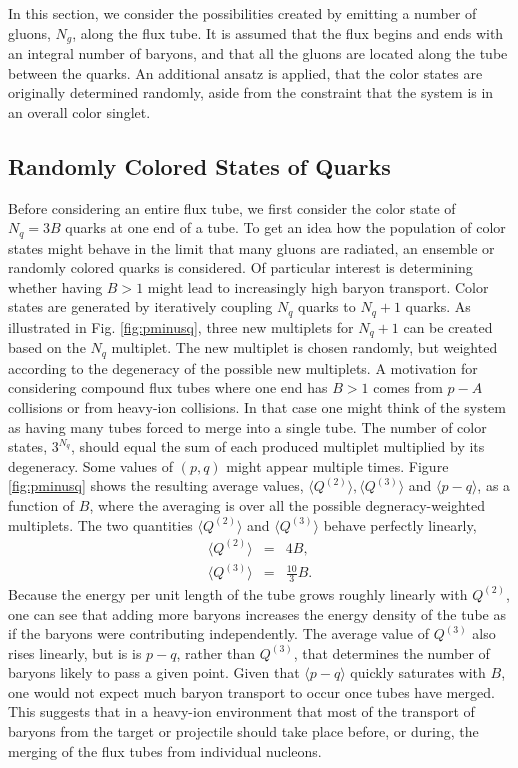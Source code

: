 \documentclass[aps, prc, 12pt, nofootinbib, showpacs, superscriptaddress, tightenlines, groupedaddress]{revtex4-2}
\begin{document}
In this section, we consider the possibilities created by emitting a number of gluons, $N_g$, along the flux tube. It is assumed that the flux begins and ends with an integral number of baryons, and that all the gluons are located along the tube between the quarks. An additional ansatz is applied, that the color states are originally determined randomly, aside from the constraint that the system is in an overall color singlet.

\subsection{Randomly Colored States of Quarks}

Before considering an entire flux tube, we first consider the color state of $N_q=3B$ quarks at one end of a tube. To get an idea how the population of color states might behave in the limit that many gluons are radiated, an ensemble or randomly colored quarks is considered. Of particular interest is determining whether having $B>1$ might lead to increasingly high baryon transport. Color states are generated by iteratively coupling $N_q$ quarks to $N_q+1$ quarks. As illustrated in Fig. \ref{fig:pminusq}, three new multiplets for $N_q+1$ can be created based on the $N_q$ multiplet. The new multiplet is chosen randomly, but weighted according to the degeneracy of the possible new multiplets. A motivation for considering compound flux tubes where one end has $B>1$ comes from $p-A$ collisions or from heavy-ion collisions. In that case one might think of the system as having many tubes forced to merge into a single tube. The number of color states, $3^{N_q}$, should equal the sum of each produced multiplet multiplied by its degeneracy. Some values of $(p,q)$ might appear multiple times. Figure \ref{fig:pminusq} shows the resulting average values, $\langle Q^{(2)}\rangle, \langle Q^{(3)}\rangle$ and $\langle p-q\rangle$, as a function of $B$, where the averaging is over all the possible degneracy-weighted multiplets. The two quantities $\langle Q^{(2)}\rangle$ and  $\langle Q^{(3)}\rangle$ behave perfectly linearly,
\begin{eqnarray}
\langle Q^{(2)}\rangle&=&4B,\\
\langle Q^{(3)}\rangle&=&\frac{10}{3}B.
\end{eqnarray}
Because the energy per unit length of the tube grows roughly linearly with $Q^{(2)}$, one can see that adding more baryons increases the energy density of the tube as if the baryons were contributing independently. The average value of $Q^{(3)}$ also rises linearly, but is is $p-q$, rather than $Q^{(3)}$, that determines the number of baryons likely to pass a given point. Given that $\langle p-q\rangle$ quickly saturates with $B$, one would not expect much baryon transport to occur once tubes have merged. This suggests that in a heavy-ion environment that most of the transport of baryons from the target or projectile should take place before, or during, the merging of the flux tubes from individual nucleons.  
\end{document}
